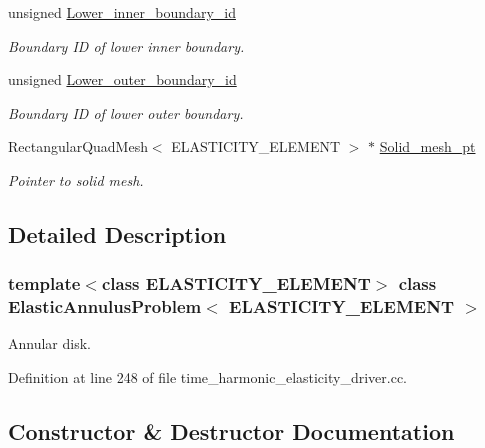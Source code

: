 \begin{DoxyCompactItemize}
unsigned \hyperlink{classElasticAnnulusProblem_a810f81246ad9ffdc4206016bfb8a56da}{Lower\+\_\+inner\+\_\+boundary\+\_\+id}
\begin{DoxyCompactList}\small\item\em Boundary ID of lower inner boundary. \end{DoxyCompactList}\item 
unsigned \hyperlink{classElasticAnnulusProblem_a21dfc08e2f80d32b674670b1194f7386}{Lower\+\_\+outer\+\_\+boundary\+\_\+id}
\begin{DoxyCompactList}\small\item\em Boundary ID of lower outer boundary. \end{DoxyCompactList}\item 
Rectangular\+Quad\+Mesh$<$ E\+L\+A\+S\+T\+I\+C\+I\+T\+Y\+\_\+\+E\+L\+E\+M\+E\+NT $>$ $\ast$ \hyperlink{classElasticAnnulusProblem_af0c334a5413eac6077177769b2a5f1f8}{Solid\+\_\+mesh\+\_\+pt}
\begin{DoxyCompactList}\small\item\em Pointer to solid mesh. \end{DoxyCompactList}\end{DoxyCompactItemize}


\subsection{Detailed Description}
\subsubsection*{template$<$class E\+L\+A\+S\+T\+I\+C\+I\+T\+Y\+\_\+\+E\+L\+E\+M\+E\+NT$>$\newline
class Elastic\+Annulus\+Problem$<$ E\+L\+A\+S\+T\+I\+C\+I\+T\+Y\+\_\+\+E\+L\+E\+M\+E\+N\+T $>$}

Annular disk. 

Definition at line 248 of file time\+\_\+harmonic\+\_\+elasticity\+\_\+driver.\+cc.



\subsection{Constructor \& Destructor Documentation}
\mbox{\label{classElasticAnnulusProblem_aedf3d30576ccc20e2d8aa809cf075228}} 
